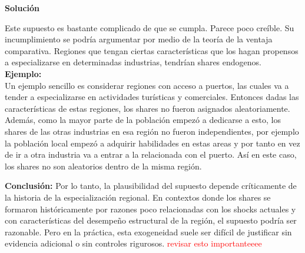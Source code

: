 \documentclass[a4paper, answers, addpoints, 11pt]{exam}
\newenvironment{solucion}{%
  \begin{mdframed}[
    backgroundcolor=blue!5,    %
    linecolor=blue!50,          %
    linewidth=2pt,              %
    leftmargin=10pt,            %
    rightmargin=8pt,           %
    topline=true,              %
    bottomline=true,            %
    roundcorner=10pt,           %
    innerleftmargin=10pt,       %
    innerrightmargin=10pt,      %
    innerbottommargin=10pt,     %
    innertopmargin=10pt         %
  ]%
  \begin{tcolorbox}[colframe=blue!50!black, colback=blue!50, coltitle=white, sharp corners=all, boxrule=1mm, width=\textwidth, halign=left, valign=center, top=0mm, bottom=0mm, left=0mm, right=0mm] \textbf{Solución} \end{tcolorbox} }{\end{mdframed}}
\begin{document}
\begin{enumerate}
\begin{solucion}
Este supuesto es bastante complicado de que se cumpla. Parece poco creíble. Su incumplimiento se podría argumentar por medio de la teoría de la ventaja comparativa. Regiones que tengan ciertas características que los hagan propensos a especializarse en determinadas industrias, tendrían shares endogenos.\\

\textbf{Ejemplo:}\\
Un ejemplo sencillo es considerar regiones con acceso a puertos, las cuales va a tender a especializarse en actividades turísticas y comerciales. Entonces dadas las características de estas regiones, los shares no fueron asignados aleatoriamente. Además, como la mayor parte de la población empezó a dedicarse a esto, los shares de las otras industrias en esa región no fueron independientes, por ejemplo la población local empezó a adquirir habilidades en estas areas y por tanto en vez de ir a otra industria va a entrar a la relacionada con el puerto. Así en este caso, los shares no son aleatorios dentro de la misma región.


\textbf{Conclusión:}
Por lo tanto, la plausibilidad del supuesto depende críticamente de la historia de la especialización regional. En contextos donde los shares se formaron históricamente por razones poco relacionadas con los shocks actuales y con características del desempeño estructural de la región, el supuesto podría ser razonable. Pero en la práctica, esta exogeneidad suele ser difícil de justificar sin evidencia adicional o sin controles rigurosos.
\textcolor{red}{revisar esto importanteeee}
\end{solucion}
    

\end{enumerate}
\end{document}
